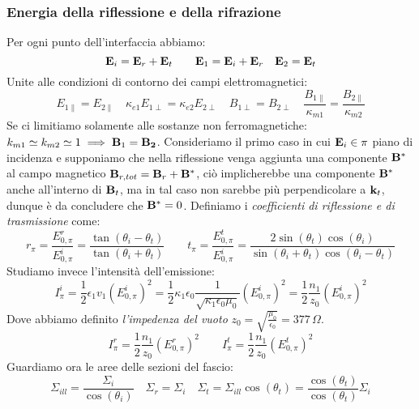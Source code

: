 \documentclass[12pt,a4paper]{article}
\begin{document}
\subsubsection{Energia della riflessione e della rifrazione}
Per ogni punto dell'interfaccia abbiamo:
\begin{equation*}
    \vb{E}_i = \vb{E}_r+\vb{E}_t \qquad \vb{E}_1= \vb{E}_i+\vb{E}_r \quad \vb{E}_2 = \vb{E}_t
\end{equation*}
Unite alle condizioni di contorno dei campi elettromagnetici:
\begin{equation*}
    E_{1\parallel}= E_{2\parallel}\quad \kappa_{e1}E_{1\perp} = \kappa_{e2}E_{2\perp}\quad B_{1\perp}= B_{2\perp}\quad 
    \frac{B_{1\parallel}}{\kappa_{m1}}= \frac{B_{2\parallel}}{\kappa_{m2}}
\end{equation*}
Se ci limitiamo solamente alle sostanze non ferromagnetiche: $k_{m1}\simeq k_{m2}\simeq1\implies\vb{B}_1=\vb{B_2}$.
Consideriamo il primo caso in cui $\vb{E}_i \in\pi$ piano di incidenza e supponiamo che nella riflessione venga aggiunta una componente 
$\vb{B}^*$ al campo magnetico $\vb{B}_{r, tot}= \vb{B}_r+\vb{B}^*$, ciò implicherebbe una componente $\vb{B}^*$ anche all'interno di $\vb{B}_t$,
ma in tal caso non sarebbe più perpendicolare a $\vb{k}_t$, dunque è da concludere che $\vb{B}^*=0$.
Definiamo i \textit{coefficienti di riflessione e di trasmissione} come:
\begin{equation*}
    r_\pi= \frac{E_{0,\pi}^r}{E_{0,\pi}^i}= \frac{\tan(\theta_i-\theta_t)}{\tan(\theta_i+\theta_t)}\qquad 
    t_\pi= \frac{E_{0,\pi}^t}{E_{0,\pi}^i}= \frac{2\sin(\theta_t)\cos(\theta_i)}{\sin(\theta_i+\theta_t)\cos(\theta_i-\theta_t)}
\end{equation*}
Studiamo invece l'intensità dell'emissione:
\begin{equation*}
    I_\pi^i= \frac{1}{2}\epsilon_1 v_1 (E_{0,\pi}^i)^2= \frac{1}{2}\kappa_1\epsilon_0\frac{1}{\sqrt{\kappa_1\epsilon_0\mu_0}} (E_{0,\pi}^i)^2=
    \frac{1}{2}\frac{n_1}{z_0} (E_{0,\pi}^i)^2
\end{equation*}
Dove abbiamo definito \textit{l'impedenza del vuoto} $z_0= \sqrt{\frac{\mu_0}{\epsilon_0}}= 377\, \Omega$.
\begin{equation*}
    I_\pi^r=\frac{1}{2}\frac{n_1}{z_0} (E_{0,\pi}^r)^2\qquad I_\pi^t=\frac{1}{2}\frac{n_1}{z_0} (E_{0,\pi}^t)^2
\end{equation*}
Guardiamo ora le aree delle sezioni del fascio:
\begin{equation*}
    \Sigma_{ill}= \frac{\Sigma_i}{\cos(\theta_i)}\quad \Sigma_r= \Sigma_i \quad \Sigma_t= \Sigma_{ill}\cos(\theta_t)= \frac{\cos(\theta_t)}{\cos(\theta_t)}\Sigma_i 
\end{equation*}
\end{document}
